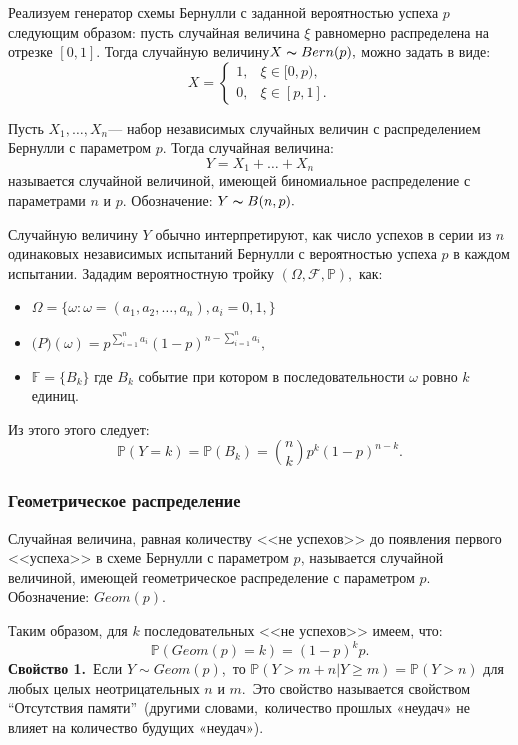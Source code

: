 \documentclass[11pt]{article}
\begin{document}
	{Реализуем генератор схемы Бернулли с заданной вероятностью успеха $p$ следующим образом: пусть случайная величина $\xi$ равномерно распределена на отрезке $[0,1].$ Тогда случайную величину$X \thicksim Bern(p),$ можно задать в виде:}
	\[X = \begin{cases}
	1, & \xi \in [0,p), \\
	0, & \xi \in [p,1].
	\end{cases}  \]
	\begin{opr}
		Пусть $X_1,\dots, X_n$--- набор независимых случайных величин с распределением Бернулли с параметром $p$. Тогда случайная величина:
		\[ Y = X_1 + \dots + X_n \]
		называется случайной величиной, имеющей биномиальное распределение с параметрами $n$ и $p$. Обозначение: $Y \thicksim B(n,p).$
	\end{opr}
	{Случайную величину $Y$ обычно интерпретируют, как число успехов в серии из $n$ одинаковых независимых испытаний Бернулли с вероятностью успеха $p$ в каждом испытании. Зададим вероятностную тройку $(\Omega,\mathcal{F},\mathds{P}),$ как:}
	\begin{itemize}
		\item {$\Omega = \{\omega:\omega = (a_1,a_2,\dots, a_n), a_i = 0,1, \}$} 
		\item {$\mathds(P)(\omega)=p^{\sum_{i=1}^{n}a_i}(1 - p)^{n - \sum_{i=1}^{n}a_i},$}
		\item {$\mathds{F}=\{B_k\}$ где $B_k$ событие при котором в последовательности $\omega$ ровно $k$ единиц.}
	\end{itemize}
    {Из этого этого следует:}
    \[\mathds{P}(Y = k) = \mathds{P}(B_k) = \binom{n}{k}p^k(1 - p)^{n - k}. \]
    \subsubsection{Геометрическое распределение}
    \begin{opr}
    	Случайная величина, равная количеству <<не успехов>> до появления первого <<успеха>> в схеме Бернулли с параметром $p$, называется случайной величиной, имеющей геометрическое распределение с параметром $p$. Обозначение: $Geom(p).$
    \end{opr}
    {Таким образом, для $k$ последовательных <<не успехов>> имеем, что:}
    \[ \mathds{P}(Geom(p) = k) = (1 - p)^kp. \] 
    \textbf{Свойство 1.}\ Если {$Y \sim Geom(p)$},\ то {$\mathbb P(Y > m + n| Y \geqslant m) = \mathbb P (Y > n)$} для любых целых неотрицательных {$n$} и {$m$}.\ Это свойство называется свойством \textquotedblleft Отсутствия памяти\textquotedblright\ (другими словами,\ количество прошлых «неудач» не влияет на количество будущих «неудач»).
     
\end{document}
